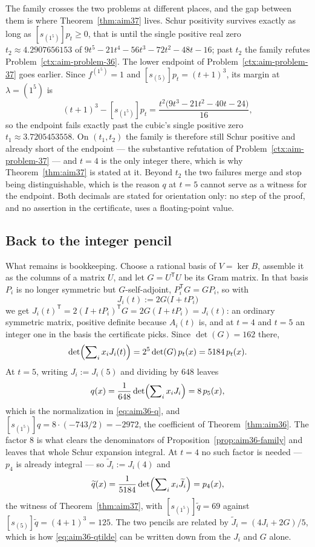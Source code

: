 \begin{remark}
The family crosses the two problems at different places, and the gap between
them is where Theorem~\ref{thm:aim37} lives.  Schur positivity survives exactly as long
as $[s_{(1^5)}]p_t\ge0$, that is until the single positive real zero
$t_2\approx4.2907656153$ of $9t^5-21t^4-56t^3-72t^2-48t-16$; past $t_2$ the
family refutes Problem~\ref{ctx:aim-problem-36}.  The lower endpoint of
Problem~\ref{ctx:aim-problem-37} goes earlier.  Since $f^{(1^5)}=1$ and
$[s_{(5)}]p_t=(t+1)^3$, its margin at $\lambda=(1^5)$ is
\[
(t+1)^3-[s_{(1^5)}]p_t=\frac{t^2\bigl(9t^3-21t^2-40t-24\bigr)}{16},
\]
so the endpoint fails exactly past the cubic's single positive zero
$t_1\approx3.7205453558$.  On $(t_1,t_2)$ the family is therefore still Schur
positive and already short of the endpoint --- the substantive refutation of
Problem~\ref{ctx:aim-problem-37} --- and $t=4$ is the only integer there, which
is why Theorem~\ref{thm:aim37} is stated at it.  Beyond $t_2$ the two failures merge and
stop being distinguishable, which is the reason $q$ at $t=5$ cannot serve as a
witness for the endpoint.  Both decimals are stated for orientation only: no step
of the proof, and no assertion in the certificate, uses a floating-point value.
\end{remark}

\subsection*{Back to the integer pencil}

What remains is bookkeeping.  Choose a rational basis of $V=\ker B$, assemble it
as the columns of a matrix $U$, and let $G=U^{\mathsf T}U$ be its Gram matrix.
In that basis $P_i$ is no longer symmetric but $G$-self-adjoint,
$P_i^{\mathsf T}G=GP_i$, so with
\[
J_i(t):=2G\bigl(I+tP_i\bigr)
\]
we get $J_i(t)^{\mathsf T}=2(I+tP_i)^{\mathsf T}G=2G(I+tP_i)=J_i(t)$: an ordinary
symmetric matrix, positive definite because $A_i(t)$ is, and at $t=4$ and $t=5$
an integer one in the basis the certificate picks.  Since $\det(G)=162$ there,
\[
\det\Bigl(\sum\nolimits_ix_iJ_i(t)\Bigr)=2^5\det(G)\,p_t(x)=5184\,p_t(x).
\]
At $t=5$, writing $J_i:=J_i(5)$ and dividing by $648$ leaves
\[
q(x)=\frac1{648}\det\Bigl(\sum\nolimits_ix_iJ_i\Bigr)=8\,p_5(x),
\]
which is the normalization in \eqref{eq:aim36-q}, and
$[s_{(1^5)}]q=8\cdot(-743/2)=-2972$, the coefficient of Theorem~\ref{thm:aim36}.  The
factor $8$ is what clears the denominators of
Proposition~\ref{prop:aim36-family} and leaves that whole Schur expansion
integral.  At $t=4$ no such factor is needed --- $p_4$ is already integral --- so
$\widetilde J_i:=J_i(4)$ and
\[
\widetilde q(x)=\frac1{5184}\det\Bigl(\sum\nolimits_ix_i\widetilde J_i\Bigr)=p_4(x),
\]
the witness of Theorem~\ref{thm:aim37}, with $[s_{(1^5)}]\widetilde q=69$ against
$[s_{(5)}]\widetilde q=(4+1)^3=125$.  The two pencils are related by
$\widetilde J_i=(4J_i+2G)/5$, which is how \eqref{eq:aim36-qtilde} can be
written down from the $J_i$ and $G$ alone.

